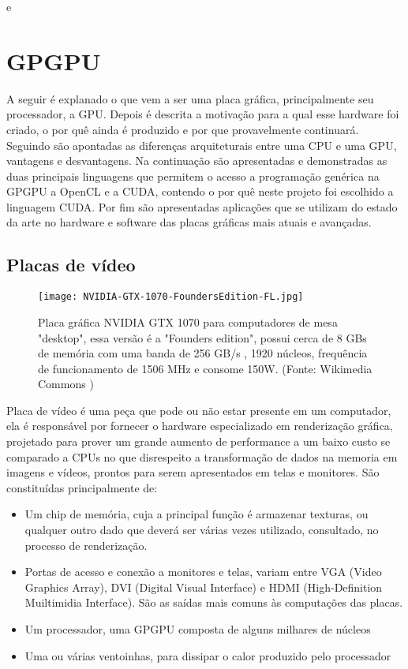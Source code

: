 e\chapter{GPGPU}
\label{cap:gpgpu}

A seguir é explanado o que vem a ser uma placa gráfica, principalmente seu processador, a GPU. Depois é descrita a motivação para a qual esse hardware foi criado, o por quê ainda é produzido e por que provavelmente continuará. Seguindo são apontadas as diferenças arquiteturais entre uma CPU e uma GPU, vantagens e desvantagens. Na continuação são apresentadas e demonstradas as duas principais linguagens que permitem o acesso a programação genérica na GPGPU a OpenCL e a CUDA, contendo o por quê neste projeto foi escolhido a linguagem CUDA. Por fim são apresentadas aplicações que se utilizam do estado da arte no hardware e software das placas gráficas mais atuais e avançadas.

\section{Placas de vídeo}
\label{sec:video_boards}
  \begin{figure}[!h]
    \centering
    \texttt{[image: NVIDIA-GTX-1070-FoundersEdition-FL.jpg]}
    \caption{Placa gráfica NVIDIA GTX 1070 para computadores de mesa "desktop", essa versão é a "Founders edition", possui cerca de 8 GBs de memória com uma banda de 256 GB/s , 1920 núcleos, frequência de funcionamento de 1506 MHz e consome 150W. (Fonte: Wikimedia Commons \protect\footnotemark)}
    \label{fig:gtx1070}
  \end{figure}


  Placa de vídeo é uma peça que pode ou não estar presente em um computador, ela é responsável por fornecer o hardware especializado em renderização gráfica, projetado para prover um grande aumento de performance a um baixo custo se comparado a CPUs no que disrespeito a transformação de dados na memoria em imagens e vídeos, prontos para serem apresentados em telas e monitores. São constituídas principalmente de:
  \begin{itemize}
    \item Um chip de memória, cuja a principal função é armazenar texturas, ou qualquer outro dado que deverá ser várias vezes utilizado, consultado, no processo de renderização.
    \item Portas de acesso e conexão a monitores e telas, variam entre VGA (Video Graphics Array), DVI (Digital Visual Interface) e HDMI (High-Definition Muiltimidia Interface). São as saídas mais comuns às computações das placas.
    \item Um processador, uma GPGPU composta de alguns milhares de núcleos
    \item Uma ou várias ventoinhas, para dissipar o calor produzido pelo processador
  \end{itemize}

